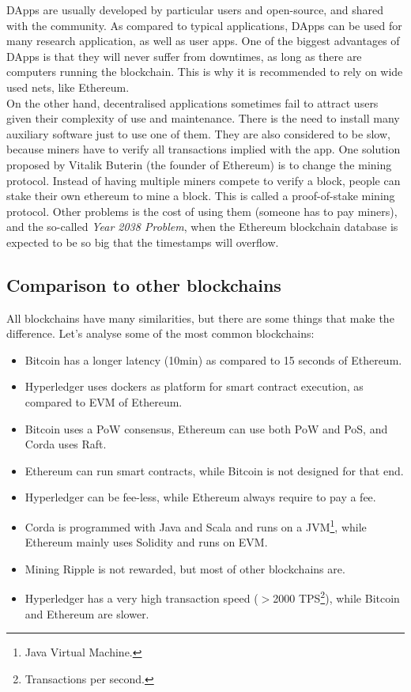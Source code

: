 \documentclass[10pt]{article}
\begin{document}
\begin{multicols}{2}
DApps are usually developed by particular users and open-source, and shared with the community. As compared to typical applications, DApps can be used for many research application, as well as user apps. One of the biggest advantages of DApps is that they will never suffer from downtimes, as long as there are computers running the blockchain. This is why it is recommended to rely on wide used nets, like Ethereum.\\

On the other hand, decentralised applications sometimes fail to attract users given their complexity of use and maintenance. There is the need to install many auxiliary software just to use one of them. They are also considered to be slow, because miners have to verify all transactions implied with the app. One solution proposed by Vitalik Buterin (the founder of Ethereum) is to change the mining protocol. Instead of having multiple miners compete to verify a block, people can stake their own ethereum to mine a block. This is called a proof-of-stake mining protocol. Other problems is the cost of using them (someone has to pay miners), and the so-called \textit{Year 2038 Problem}, when the Ethereum blockchain database is expected to be so big that the timestamps will overflow.

\subsection{Comparison to other blockchains}

All blockchains have many similarities, but there are some things that make the difference. Let's analyse some of the most common blockchains:

\begin{itemize}
	\item Bitcoin has a longer latency (10min) as compared to 15 seconds of Ethereum.
	\item Hyperledger uses dockers as platform for smart contract execution, as compared to EVM of Ethereum.
	\item Bitcoin uses a PoW consensus, Ethereum can use both PoW and PoS, and Corda uses Raft.
	\item Ethereum can run smart contracts, while Bitcoin is not designed for that end.
	\item Hyperledger can be fee-less, while Ethereum always require to pay a fee.
	\item Corda is programmed with Java and Scala and runs on a JVM\footnote{Java Virtual Machine.}, while Ethereum mainly uses Solidity and runs on EVM.
	\item Mining Ripple is not rewarded, but most of other blockchains are.
	\item Hyperledger has a very high transaction speed ($>$2000 TPS\footnote{Transactions per second.}), while Bitcoin and Ethereum are slower.
	

\end{itemize}
\end{multicols}
\end{document}
